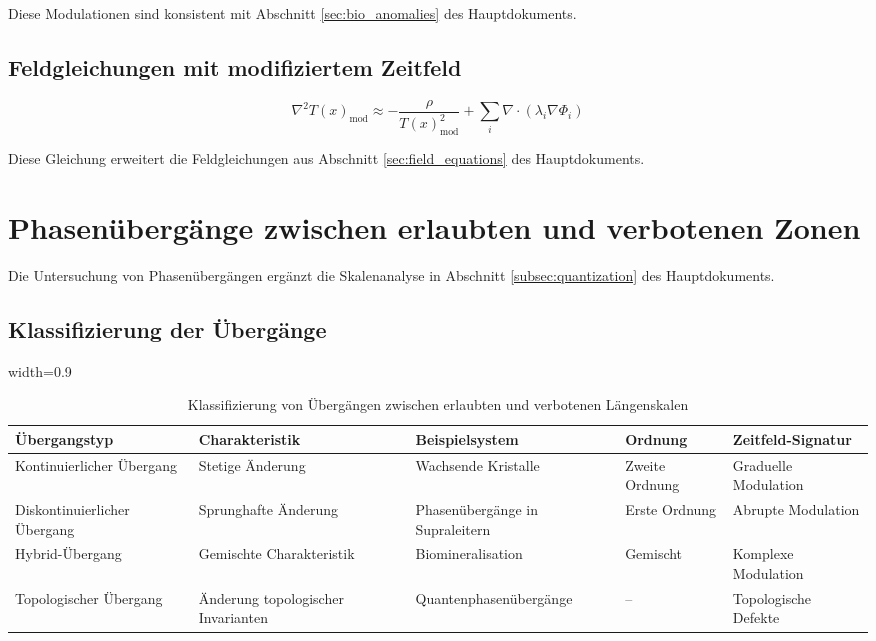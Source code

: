\documentclass[12pt,a4paper]{article}
\newcommand{\Tfield}{T(x)}
\newcommand{\tablescale}{0.9}
\begin{document}
	Diese Modulationen sind konsistent mit Abschnitt \ref{sec:bio_anomalies} des Hauptdokuments.
	
	\subsection{Feldgleichungen mit modifiziertem Zeitfeld}
	\label{subsec:feldgleichungen}
	
	\begin{equation}
		\nabla^2\Tfield_{\text{mod}} \approx -\frac{\rho}{\Tfield_{\text{mod}}^2} + \sum_i \nabla \cdot \left( \lambda_i \nabla \Phi_i \right)
	\end{equation}
	
	Diese Gleichung erweitert die Feldgleichungen aus Abschnitt \ref{sec:field_equations} des Hauptdokuments.
	
	\section{Phasenübergänge zwischen erlaubten und verbotenen Zonen}
	\label{sec:phasenuebergaenge}
	
	Die Untersuchung von Phasenübergängen ergänzt die Skalenanalyse in Abschnitt \ref{subsec:quantization} des Hauptdokuments.
	
	\subsection{Klassifizierung der Übergänge}
	\label{subsec:klassifizierung_uebergaenge}
	
	\begin{table}[H]
		\centering
		\begin{adjustbox}{width=\tablescale\textwidth}
			\begin{tabular}{lllll}
				\toprule
				\textbf{Übergangstyp} & \textbf{Charakteristik} & \textbf{Beispielsystem} & \textbf{Ordnung} & \textbf{Zeitfeld-Signatur} \\
				\midrule
				Kontinuierlicher Übergang & Stetige Änderung & Wachsende Kristalle & Zweite Ordnung & Graduelle Modulation \\
				Diskontinuierlicher Übergang & Sprunghafte Änderung & Phasenübergänge in Supraleitern & Erste Ordnung & Abrupte Modulation \\
				Hybrid-Übergang & Gemischte Charakteristik & Biomineralisation & Gemischt & Komplexe Modulation \\
				Topologischer Übergang & Änderung topologischer Invarianten & Quantenphasenübergänge & -- & Topologische Defekte \\
				\bottomrule
			\end{tabular}
		\end{adjustbox}
		\caption{Klassifizierung von Übergängen zwischen erlaubten und verbotenen Längenskalen}
		\label{tab:transitions}
	\end{table}
	
\end{document}
